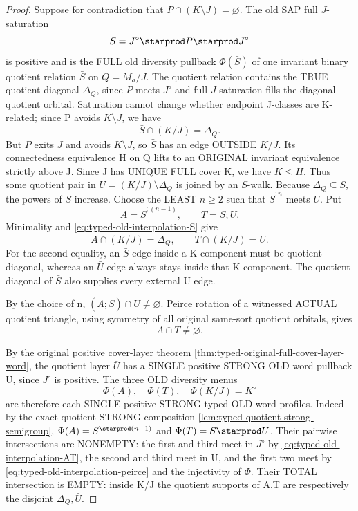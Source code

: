 \begin{proof}
Suppose for contradiction that
$P\cap(K\setminus J)=\varnothing$.
The old SAP full $J$-saturation
\[
           S=J^\circ\starprod P\starprod J^\circ
\]
is positive and is the FULL old diversity
pullback $\Phi(\bar S)$ of one invariant
binary quotient relation $\bar S$ on
$Q=M_a/J$. The quotient relation contains
the TRUE quotient diagonal $\Delta_Q$,
since $P$ meets $J^\circ$ and full
$J$-saturation fills the diagonal
quotient orbital. Saturation cannot
change whether endpoint J-classes
are K-related; since P avoids
$K\setminus J$, we have
\[
                   \bar S\cap(K/J)=\Delta_Q.
\tag{OWI-S}\label{eq:typed-old-interpolation-S}
\]
But $P$ exits $J$ and avoids $K\setminus J$,
so $\bar S$ has an edge OUTSIDE $K/J$.
Its connectedness equivalence H on Q
lifts to an ORIGINAL invariant
equivalence strictly above J.
Since J has UNIQUE FULL cover K,
we have $K\le H$. Thus some quotient
pair in $\bar U=(K/J)\setminus\Delta_Q$
is joined by an $\bar S$-walk.
Because $\Delta_Q\subseteq\bar S$,
the powers of $\bar S$ increase.
Choose the LEAST $n\ge2$ such that
$\bar S^{;n}$ meets $\bar U$.
Put
\[
              A=\bar S^{;(n-1)},\qquad
              T=\bar S;\bar U.
\]
Minimality and \eqref{eq:typed-old-interpolation-S}
give
\[
 A\cap(K/J)=\Delta_Q,\qquad
 T\cap(K/J)=\bar U.
\tag{OWI-ST}\label{eq:typed-old-interpolation-AT}
\]
For the second equality, an $\bar S$-edge
inside a K-component must be quotient
diagonal, whereas an $\bar U$-edge
always stays inside that K-component.
The quotient diagonal of $\bar S$
also supplies every external U edge.

By the choice of n,
$(A;\bar S)\cap\bar U\ne\varnothing$.
Peirce rotation of a witnessed ACTUAL
quotient triangle, using symmetry of
all original same-sort quotient orbitals,
gives
\[
                         A\cap T\ne\varnothing.
\tag{OWI-P}\label{eq:typed-old-interpolation-peirce}
\]

By the original positive cover-layer theorem
\cref{thm:typed-original-full-cover-layer-word},
the quotient layer $\bar U$ has a SINGLE
positive STRONG OLD word pullback U, since
$J^\circ$ is positive. The three OLD
diversity menus
\[
               \Phi(A),\quad \Phi(T),
                           \quad \Phi(K/J)=K^\circ
\]
are therefore each SINGLE positive STRONG
typed OLD word profiles. Indeed by the
exact quotient STRONG composition
\cref{lem:typed-quotient-strong-semigroup},
$\Phi(A)=S^{\starprod(n-1)}$ and
$\Phi(T)=S\starprod U$.
Their pairwise intersections are NONEMPTY:
the first and third meet in $J^\circ$
by \eqref{eq:typed-old-interpolation-AT},
the second and third meet in U,
and the first two meet by
\eqref{eq:typed-old-interpolation-peirce}
and the injectivity of $\Phi$.
Their TOTAL intersection is EMPTY:
inside K/J the quotient supports
of A,T are respectively the
disjoint $\Delta_Q,\bar U$.


\end{proof}
